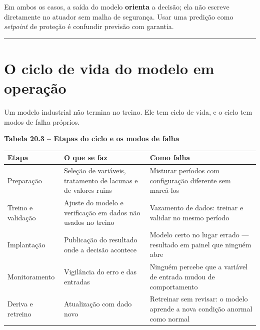 Em ambos os casos, a saída do modelo \textbf{orienta} a decisão; ela não escreve diretamente no atuador sem
malha de segurança. Usar uma predição como \emph{setpoint} de proteção é confundir previsão com garantia.

\begin{center}\rule{0.5\linewidth}{0.5pt}\end{center}

\section{O ciclo de vida do modelo em operação}\label{o-ciclo-de-vida-do-modelo-em-operauxe7uxe3o}

Um modelo industrial não termina no treino. Ele tem ciclo de vida, e o ciclo tem modos de falha
próprios.

\textbf{Tabela 20.3 -- Etapas do ciclo e os modos de falha}

\begin{longtable}[]{@{}
  >{\raggedright\arraybackslash}p{}
  >{\raggedright\arraybackslash}p{}
  >{\raggedright\arraybackslash}p{}@{}}
\toprule\noalign{}
\begin{minipage}[b]{\linewidth}\raggedright
Etapa
\end{minipage} & \begin{minipage}[b]{\linewidth}\raggedright
O que se faz
\end{minipage} & \begin{minipage}[b]{\linewidth}\raggedright
Como falha
\end{minipage} \\
\midrule\noalign{}
\endhead
\bottomrule\noalign{}
\endlastfoot
Preparação & Seleção de variáveis, tratamento de lacunas e de valores ruins & Misturar períodos com configuração diferente sem marcá-los \\
Treino e validação & Ajuste do modelo e verificação em dados não usados no treino & Vazamento de dados: treinar e validar no mesmo período \\
Implantação & Publicação do resultado onde a decisão acontece & Modelo certo no lugar errado --- resultado em painel que ninguém abre \\
Monitoramento & Vigilância do erro e das entradas & Ninguém percebe que a variável de entrada mudou de comportamento \\
Deriva e retreino & Atualização com dado novo & Retreinar sem revisar: o modelo aprende a nova condição anormal como normal \\
\end{longtable}

